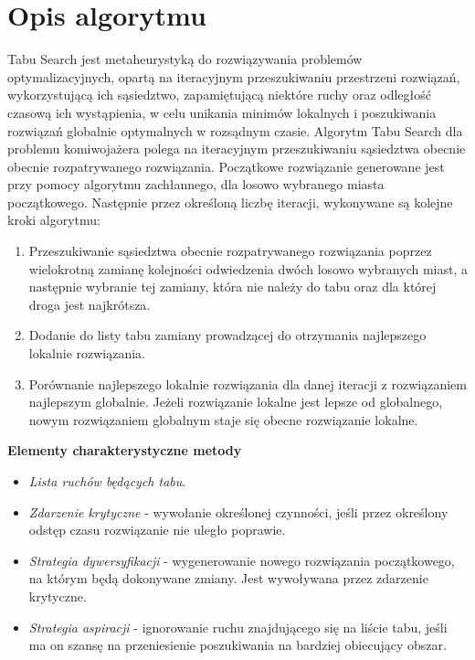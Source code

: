 \documentclass{article}
\begin{document}
\section{Opis algorytmu}
\par Tabu Search jest metaheurystyką do rozwiązywania problemów optymalizacyjnych, opartą na iteracyjnym przeszukiwaniu
przestrzeni rozwiązań, wykorzystującą ich sąsiedztwo, zapamiętującą niektóre ruchy oraz odległość czasową ich wystąpienia, w celu unikania minimów lokalnych i poszukiwania rozwiązań globalnie optymalnych w rozsądnym czasie.
\newline
\newline
Algorytm Tabu Search dla problemu komiwojażera polega na iteracyjnym przeszukiwaniu sąsiedztwa obecnie obecnie rozpatrywanego rozwiązania. Początkowe rozwiązanie generowane jest przy pomocy algorytmu zachłannego, dla losowo wybranego miasta początkowego. Następnie przez określoną liczbę iteracji, wykonywane są kolejne kroki algorytmu: 
	\begin{enumerate}
	\item Przeszukiwanie sąsiedztwa obecnie rozpatrywanego rozwiązania poprzez wielokrotną zamianę kolejności odwiedzenia dwóch losowo wybranych miast, a następnie wybranie tej zamiany, która nie należy do tabu oraz dla której droga jest najkrótsza.
	\item Dodanie do listy tabu zamiany prowadzącej do otrzymania najlepszego lokalnie rozwiązania.
	\item Porównanie najlepszego lokalnie rozwiązania dla danej iteracji z rozwiązaniem najlepszym globalnie. Jeżeli rozwiązanie lokalne jest lepsze od globalnego, nowym rozwiązaniem globalnym staje się obecne rozwiązanie lokalne.
\end{enumerate}

\textbf{Elementy charakterystyczne metody}
\begin{itemize}
	\item \textit{Lista ruchów będących tabu}.
	\item \textit{Zdarzenie krytyczne} - wywołanie określonej czynności, jeśli przez określony odstęp czasu rozwiązanie nie uległo poprawie.
	\item \textit{Strategia dywersyfikacji} - wygenerowanie nowego rozwiązania początkowego, na którym będą dokonywane zmiany. Jest wywoływana przez zdarzenie krytyczne.
	\item \textit{Strategia aspiracji} - ignorowanie ruchu znajdującego się na liście tabu, jeśli ma on szansę na przeniesienie poszukiwania na bardziej obiecujący obszar.
\end{itemize}
\newpage
\end{document}
